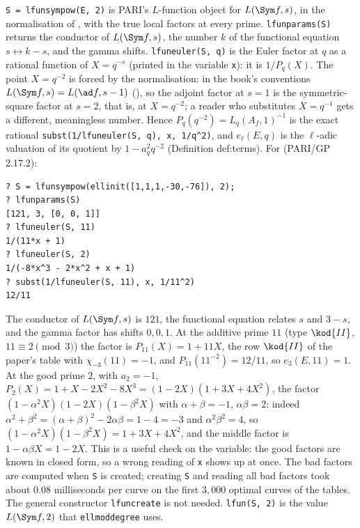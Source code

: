 \begin{sloppypar}
\begin{remark}\label{rem:computation:lfunsympow}
\texttt{S = lfunsympow(E, 2)} is PARI's $L$-function object for $L(\Sym f,s)$, in the normalisation of , with the true local factors
at every prime. \texttt{lfunparams(S)} returns the conductor of $L(\Sym f,s)$, the number $k$ of the functional equation $s\leftrightarrow k-s$, and
the gamma shifts. \texttt{lfuneuler(S, q)} is the Euler factor at $q$ as a rational function of $X=q^{-s}$ (printed in the variable
\texttt{x}): it is $1/P_q(X)$. The point $X=q^{-2}$ is forced by the normalisation: in the book's conventions $L(\Sym f,s)=L(\ad f,s-1)$
(), so the adjoint factor at $s=1$ is the symmetric-square factor at $s=2$, that is, at $X=q^{-2}$; a reader who substitutes
$X=q^{-1}$ gets a different, meaningless number. Hence $P_q(q^{-2})=L_q(A_f,1)^{-1}$ is the exact rational \texttt{subst(1/lfuneuler(S, q), x, 1/q\^{}2)}, and
$e_\ell(E,q)$ is the $\ell$-adic valuation of its quotient by $1-a_q^2q^{-2}$ (Definition def:terms). For  (PARI/GP 2.17.2):
\begin{lstlisting}[language=GP]
? S = lfunsympow(ellinit([1,1,1,-30,-76]), 2);
? lfunparams(S)
[121, 3, [0, 0, 1]]
? lfuneuler(S, 11)
1/(11*x + 1)
? lfuneuler(S, 2)
1/(-8*x^3 - 2*x^2 + x + 1)
? subst(1/lfuneuler(S, 11), x, 1/11^2)
12/11
\end{lstlisting}
The conductor of $L(\Sym f,s)$ is $121$, the functional equation relates $s$ and $3-s$, and the gamma factor has shifts $0,0,1$. At the additive
prime $11$ (type $\kod{II}$, $11\equiv2\pmod3$) the factor is $P_{11}(X)=1+11X$, the row $\kod{II}$ of the paper's table with $\chi_{-3}(11)=-1$, and
$P_{11}(11^{-2})=12/11$, so $e_3(E,11)=1$. At the good prime $2$, with $a_2=-1$, $P_2(X)=1+X-2X^2-8X^3=(1-2X)(1+3X+4X^2)$, the factor
$(1-\alpha^2X)(1-2X)(1-\beta^2X)$ with $\alpha+\beta=-1$, $\alpha\beta=2$: indeed $\alpha^2+\beta^2=(\alpha+\beta)^2-2\alpha\beta=1-4=-3$ and $\alpha^2\beta^2=4$, so
$(1-\alpha^2X)(1-\beta^2X)=1+3X+4X^2$, and the middle factor is $1-\alpha\beta X=1-2X$. This is a useful check on the variable: the good factors are
known in closed form, so a wrong reading of \texttt{x} shows up at once. The bad factors are computed when \texttt{S} is created; creating
\texttt{S} and reading all bad factors took about $0.08$ milliseconds per curve on the first $3{,}000$ optimal curves of the tables. The
general constructor \texttt{lfuncreate} is not needed. \texttt{lfun(S, 2)} is the value $L(\Sym f,2)$ that \texttt{ellmoddegree} uses.
\end{remark}


\end{sloppypar}
